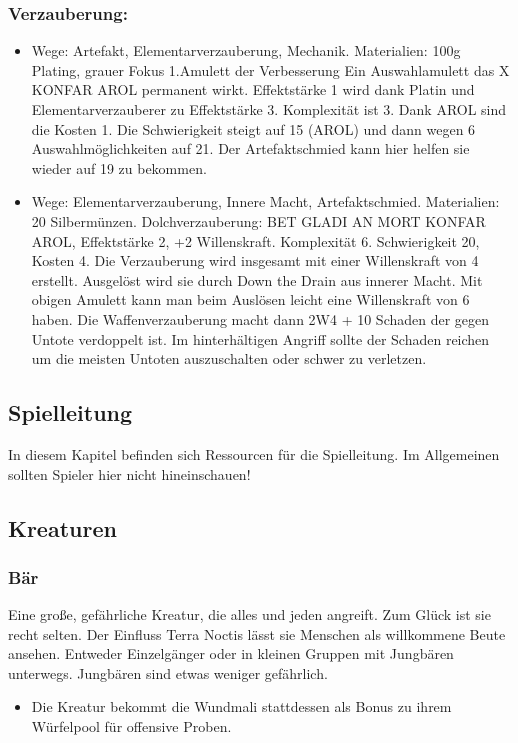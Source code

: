 \documentclass{article}
\begin{document}
\subsubsection{Verzauberung:}
\begin{itemize}
\item Wege: Artefakt, Elementarverzauberung, Mechanik. Materialien: 100g Plating, grauer Fokus 1.Amulett der Verbesserung Ein Auswahlamulett das X KONFAR AROL permanent wirkt. Effektstärke 1 wird dank Platin und Elementarverzauberer zu Effektstärke 3. Komplexität ist 3. Dank AROL sind die Kosten 1. Die Schwierigkeit steigt auf 15 (AROL) und dann wegen 6 Auswahlmöglichkeiten auf 21. Der Artefaktschmied kann hier helfen sie wieder auf 19 zu bekommen.
\item Wege: Elementarverzauberung, Innere Macht, Artefaktschmied. Materialien: 20 Silbermünzen. Dolchverzauberung: BET GLADI AN MORT KONFAR AROL, Effektstärke 2, +2 Willenskraft. Komplexität 6. Schwierigkeit 20, Kosten 4. Die Verzauberung wird insgesamt mit einer Willenskraft von 4 erstellt. Ausgelöst wird sie durch Down the Drain aus innerer Macht. Mit obigen Amulett kann man beim Auslösen leicht eine Willenskraft von 6 haben. Die Waffenverzauberung macht dann 2W4 + 10 Schaden der gegen Untote verdoppelt ist. Im hinterhältigen Angriff sollte der Schaden reichen um die meisten Untoten auszuschalten oder schwer zu verletzen.
\end{itemize}


\begin{center}
\section{Spielleitung}
\end{center}

In diesem Kapitel befinden sich Ressourcen für die Spielleitung. Im Allgemeinen sollten Spieler hier nicht hineinschauen!

\begin{center}
\subsection{Kreaturen}
\end{center}

\subsubsection{Bär}

Eine große, gefährliche Kreatur, die alles und jeden angreift. Zum Glück ist sie recht selten. Der Einfluss
Terra Noctis lässt sie Menschen als willkommene Beute ansehen. Entweder Einzelgänger oder in kleinen Gruppen
mit Jungbären unterwegs. Jungbären sind etwas weniger gefährlich.
\begin{itemize}
\item Die Kreatur bekommt die Wundmali stattdessen als Bonus zu ihrem Würfelpool für offensive Proben.
\end{itemize}
\end{document}
